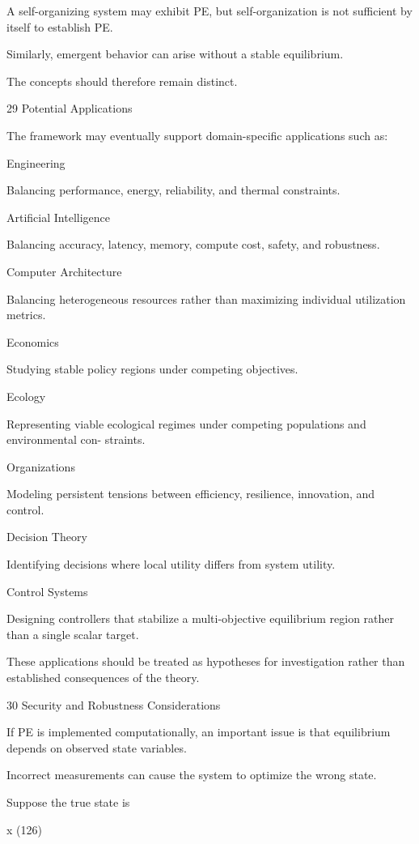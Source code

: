 \documentclass[10pt,a4paper]{article}
\begin{document}
\begin{ManuscriptText}
A self-organizing system may exhibit PE, but self-organization is not sufficient by itself to
establish PE.

Similarly, emergent behavior can arise without a stable equilibrium.

The concepts should therefore remain distinct.


29     Potential Applications

The framework may eventually support domain-specific applications such as:


Engineering

Balancing performance, energy, reliability, and thermal constraints.


Artificial Intelligence

Balancing accuracy, latency, memory, compute cost, safety, and robustness.


Computer Architecture

Balancing heterogeneous resources rather than maximizing individual utilization metrics.


Economics

Studying stable policy regions under competing objectives.


Ecology

Representing viable ecological regimes under competing populations and environmental con-
straints.


Organizations

Modeling persistent tensions between efficiency, resilience, innovation, and control.


Decision Theory

Identifying decisions where local utility differs from system utility.


Control Systems

Designing controllers that stabilize a multi-objective equilibrium region rather than a single
scalar target.

These applications should be treated as hypotheses for investigation rather than established
consequences of the theory.


30     Security and Robustness Considerations

If PE is implemented computationally, an important issue is that equilibrium depends on
observed state variables.

Incorrect measurements can cause the system to optimize the wrong state.

Suppose the true state is


                                                 x                                       (126)


\end{ManuscriptText}
\end{document}
